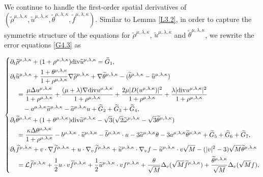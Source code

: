 \documentclass[reqno,11pt]{amsart}
\theoremstyle{plain}
\numberwithin{equation}{section}
\begin{document}
 We  continue to handle the first-order spatial derivatives of $(\widetilde{\rho}^{\mu,\lambda,\kappa},\widetilde{u}^{\mu,\lambda,\kappa},\widetilde{\theta}^{\mu,\lambda,\kappa},\widetilde{f}^{\mu,\lambda,\kappa})$. Similar to Lemma \ref{L3.2}, in order to capture the symmetric structure of the equations for $ \widetilde{\rho}^{\mu,\lambda,\kappa}$, $\widetilde{u}^{\mu,\lambda,\kappa}$ and $\widetilde{\theta}^{\mu,\lambda,\kappa} $, we rewrite the error equations \eqref{G4.3} as  
 
\begin{equation}\label{LNXG4.24}
\left\{
\begin{aligned}
&\partial_t \widetilde{\rho}^{\mu,\lambda,\kappa}+(1+\rho^{\mu,\lambda,\kappa}){\rm div}\widetilde{u}^{\mu,\lambda,\kappa} =\widetilde{G}_1,\\
&\partial_{t}\widetilde{u}^{\mu,\lambda,\kappa}+\frac{1+\theta^{\mu,\lambda,\kappa}}{1+\rho^{\mu,\lambda,\kappa}}\nabla \widetilde{\rho}^{\mu,\lambda,\kappa}+\nabla\widetilde{\theta}^{\mu,\lambda,\kappa}-(\widetilde{b}^{\mu,\lambda,\kappa}-\widetilde{u}^{\mu,\lambda,\kappa}) \\
&\quad=\frac{\mu \Delta u^{\mu,\lambda,\kappa}}{1+\rho^{\mu,\lambda,\kappa}}+\frac{(\mu+\lambda) \nabla {\rm div}u^{\mu,\lambda,\kappa}}{1+\rho^{\mu,\lambda,\kappa}}+\frac{2\mu |D(u^{\mu,\lambda,\kappa})|^2}{1+\rho^{\mu,\lambda,\kappa}}+\frac{ \lambda |{\rm div}u^{\mu,\lambda,\kappa}|^2}{1+\rho^{\mu,\lambda,\kappa}} \\
&\quad\quad-a^{\mu,\lambda,\kappa}\widetilde{u}^{\mu,\lambda,\kappa}-\widetilde{a}^{\mu,\lambda,\kappa} u+ \widetilde{G}_2+\widetilde{G}_3+\widetilde{G}_4,\\
&\partial_t\widetilde{\theta}^{{\mu,\lambda,\kappa}}+(1+\theta^{\mu,\lambda,\kappa}){\rm div}\widetilde{u}^{{\mu,\lambda,\kappa}}-\sqrt{3}(\sqrt{2}\widetilde{\omega}^{{\mu,\lambda,\kappa}}-\sqrt{3}\widetilde{\theta}^{{\mu,\lambda,\kappa}}) \\
&\quad=\frac{\kappa\Delta\theta^{{\mu,\lambda,\kappa}}}{1+\rho^{{\mu,\lambda,\kappa}}}-b^{\mu,\lambda,\kappa}\cdot \widetilde{u}^{\mu,\lambda,\kappa}-\widetilde{b}^{\mu,\lambda,\kappa}\cdot u-3\widetilde{a}^{\mu,\lambda,\kappa}\theta-3a^{\mu,\lambda,\kappa}\widetilde{\theta}^{\mu,\lambda,\kappa}+\widetilde{G}_5+\widetilde{G}_6+\widetilde{G}_7,\\
&\partial_{t}\widetilde{f}^{\mu,\lambda,\kappa}+v\cdot\nabla \widetilde{f}^{\mu,\lambda,\kappa} + {u}\cdot\nabla_v\widetilde{f}^{\mu,\lambda,\kappa}+\widetilde{u}^{\mu,\lambda,\kappa}\cdot\nabla_v f-\widetilde{u}^{\mu,\lambda,\kappa}\cdot v\sqrt{M}-(|v|^2-3)\sqrt{M}\widetilde\theta^{\mu,\lambda,\kappa} \\
&\quad= \mathcal{L}\widetilde{f}^{\mu,\lambda,\kappa}+\frac{1}{2}u\cdot v\widetilde{f}^{\mu,\lambda,\kappa}+\frac{1}{2}\widetilde{u}^{\mu,\lambda,\kappa}\cdot vf^{\mu,\lambda,\kappa}+\frac{\theta}{\sqrt{M}}\Delta_v(\sqrt{M}\widetilde{f}^{\mu,\lambda,\kappa})+\frac{\widetilde\theta^{\mu,\lambda,\kappa}}{\sqrt{M}}\Delta_v(\sqrt{M} {f} ) ,
\end{aligned}\right.
\end{equation} 
\end{document}
